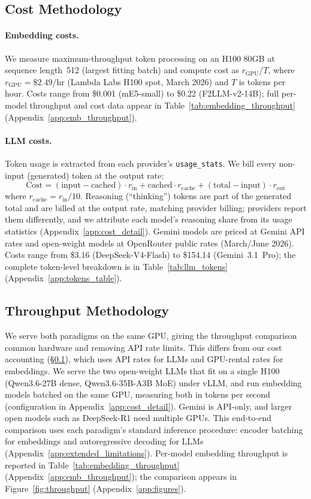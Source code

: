 \subsection{Cost Methodology}
\label{sec:cost}

\paragraph{Embedding costs.}
We measure maximum-throughput token processing on an H100 80GB at sequence length~512 (largest fitting batch) and compute cost as $r_{\text{GPU}} / T$, where $r_{\text{GPU}} = \$2.49$/hr (Lambda Labs H100 spot, March 2026) and $T$ is tokens per hour.
Costs range from \$0.001 (mE5-small) to \$0.22 (F2LLM-v2-14B); full per-model throughput and cost data appear in Table~\ref{tab:embedding_throughput} (Appendix~\ref{app:emb_throughput}).

\paragraph{LLM costs.}
Token usage is extracted from each provider's \texttt{usage\_stats}. We bill every non-input (generated) token at the output rate:
\begin{equation}
\text{Cost} = (\text{input} - \text{cached}) \cdot r_{\text{in}} + \text{cached} \cdot r_{\text{cache}} + (\text{total} - \text{input}) \cdot r_{\text{out}}
\label{eq:cost}
\end{equation}
where $r_{\text{cache}} = r_{\text{in}} / 10$. Reasoning (``thinking'') tokens are part of the generated total and are billed at the output rate, matching provider billing; providers report them differently, and we attribute each model's reasoning share from its usage statistics (Appendix~\ref{app:cost_detail}).
Gemini models are priced at Gemini API rates and open-weight models at OpenRouter public rates (March/June 2026).
Costs range from \$3.16 (DeepSeek-V4-Flash) to \$154.14 (Gemini~3.1~Pro); the complete token-level breakdown is in Table~\ref{tab:llm_tokens} (Appendix~\ref{app:tokens_table}).


\subsection{Throughput Methodology}
\label{sec:throughput}

We serve both paradigms on the same GPU, giving the throughput comparison common hardware and removing API rate limits.
This differs from our cost accounting (\S\ref{sec:cost}), which uses API rates for LLMs and GPU-rental rates for embeddings.
We serve the two open-weight LLMs that fit on a single H100 (Qwen3.6-27B dense, Qwen3.6-35B-A3B MoE) under vLLM, and run embedding models batched on the same GPU, measuring both in tokens per second (configuration in Appendix~\ref{app:cost_detail}).
Gemini is API-only, and larger open models such as DeepSeek-R1 need multiple GPUs.
This end-to-end comparison uses each paradigm's standard inference procedure: encoder batching for embeddings and autoregressive decoding for LLMs (Appendix~\ref{app:extended_limitations}).
Per-model embedding throughput is reported in Table~\ref{tab:embedding_throughput} (Appendix~\ref{app:emb_throughput}); the comparison appears in Figure~\ref{fig:throughput} (Appendix~\ref{app:figures}).
